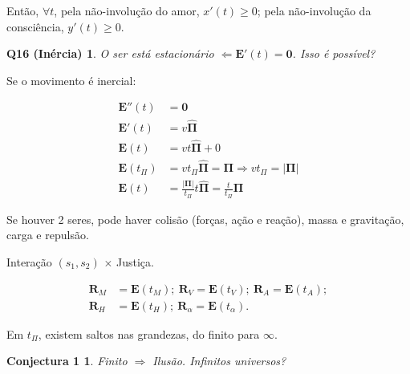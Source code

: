 \documentclass[12pt,a4paper]{article}
\begin{document}

			Ent\~ao, $\forall t$, pela n\~ao-involu\c{c}\~ao do amor, $ x'(t) \ge 0 $; pela n\~ao-involu\c{c}\~ao da consci\^encia, $ y'(t) \ge 0 $.

			\newtheorem{Q16}{Q16 (In\'ercia)}
			\begin{Q16} O ser est\'a estacion\'ario $ \Leftarrow \mathbf{E}'(t) = \mathbf{0} $. Isso \'e poss\'ivel?
			\end{Q16}

			Se o movimento \'e inercial:

			\begin{align*}
				\mathbf{E}''(t) &= \mathbf{0} \\
				\mathbf{E}'(t) &= v\mathbf{\hat\Pi} \\
				\mathbf{E}(t) &= vt\mathbf{\hat\Pi} + 0 \\
				\mathbf{E}(t_\Pi) &= vt_\Pi\mathbf{\hat\Pi} = \mathbf{\Pi} \Rightarrow vt_\Pi = |\mathbf{\Pi}| \\
				\mathbf{E}(t) &= \frac{|\mathbf{\Pi}|}{t_\Pi}t\mathbf{\hat\Pi} = \frac{t}{t_\Pi} \mathbf{\Pi}
			\end{align*}

			Se houver 2 seres, pode haver colis\~ao (for\c{c}as, a\c{c}\~ao e rea\c{c}\~ao), massa e gravita\c{c}\~ao, carga e repuls\~ao.

			Intera\c{c}\~ao $(s_1, s_2)$ $\times$ Justi\c{c}a.

			\begin{align*}
				\mathbf{R}_M &= \mathbf{E}\left(t_M\right); \
				\mathbf{R}_V = \mathbf{E}\left(t_V\right); \
				\mathbf{R}_A = \mathbf{E}\left(t_A\right); \\
				\mathbf{R}_H &= \mathbf{E}\left(t_H\right); \
				\mathbf{R}_\alpha = \mathbf{E}\left(t_\alpha\right).
			\end{align*}

			Em $ t_\Pi $, existem saltos nas grandezas, do finito para $ \infty $.

			\begin{center}
			\end{center}

			\newtheorem{C1}{Conjectura 1}
			\begin{C1} Finito $ \Rightarrow $ Ilus\~ao. Infinitos universos?
			\end{C1}
\end{document}
